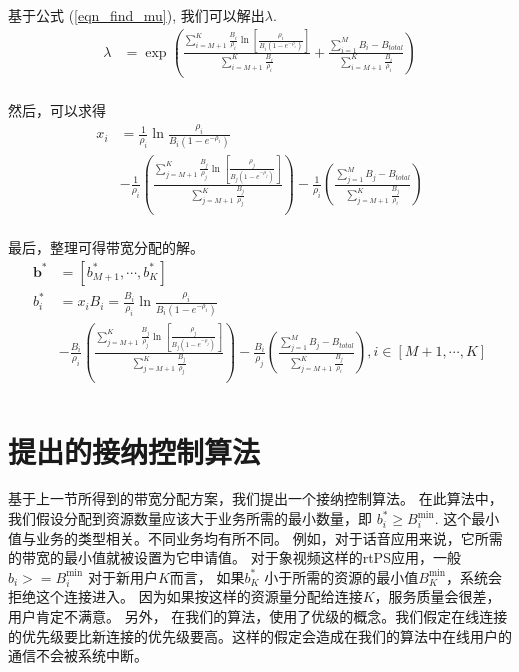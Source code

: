 基于公式 (\ref{eqn_find_mu}), 我们可以解出$\lambda$.
\begin{equation*}
\begin{split}
\lambda &= \exp \left( \frac{\sum_{i=M+1}^K \frac{B_i}{\rho_i} \ln \left[ \frac{\rho_i}{B_i(1-e^{-\rho_i})} \right]
}{\sum_{i=M+1}^K \frac{B_i}{\rho_i}} \right.
+ \left. \frac{ 
\sum_{i=1}^M B_i - B_{total}}{\sum_{i=M+1}^K \frac{B_i}{\rho_i}} \right)\\
\end{split}
\end{equation*}

然后，可以求得
%
\begin{equation}
\begin{split}
x_i & = \frac{1}{\rho_i} \ln \frac{\rho_i}{B_i(1-e^{-\rho_i})} \\
&-\frac{1}{\rho_i}\left( \frac{\sum_{j=M+1}^K \frac{B_j}{\rho_j} \ln \left[\frac{\rho_j}{B_j(1-e^{-\rho_j})}\right] 
}{\sum_{j=M+1}^K \frac{B_j}{\rho_j}} \right)
-\frac{1}{\rho_i}\left( \frac{ 
\sum_{j=1}^M B_j - B_{total}}{\sum_{j=M+1}^K \frac{B_j}{\rho_i}} \right) \\
\end{split}
\end{equation}
%

最后，整理可得带宽分配的解。
%
\begin{equation}
\begin{split}
\mathbf{b^*}& = [b^*_{M+1}, \cdots, b^*_{K}]\\
b_i^* & = x_iB_i = \frac{B_i}{\rho_i} \ln \frac{\rho_i}{B_i(1-e^{-\rho_i})} \\
&-\frac{B_i}{\rho_i}\left( \frac{\sum_{j=M+1}^K \frac{B_j}{\rho_j} \ln \left[\frac{\rho_j}{B_j(1-e^{-\rho_j})}\right] 
}{\sum_{j=M+1}^K \frac{B_j}{\rho_j}} \right)
 -\frac{B_i}{\rho_j}\left( \frac{ 
\sum_{j=1}^M B_j - B_{total}}{\sum_{j=M+1}^K \frac{B_j}{\rho_i}} \right), i \in [M+1, \cdots, K] \\
\end{split}
\label{eqn:b_i_bw}
\end{equation}
%
\section{提出的接纳控制算法}
\label{sec_alg}
基于上一节所得到的带宽分配方案，我们提出一个接纳控制算法。
在此算法中，我们假设分配到资源数量应该大于业务所需的最小数量，即
$b_i^* \ge B_i^{\min}$. 
这个最小值与业务的类型相关。不同业务均有所不同。
例如，对于话音应用来说，它所需的带宽的最小值就被设置为它申请值。
对于象视频这样的rtPS应用，一般$b_i>=B_i^{\min}$
对于新用户$K$而言，
如果$b_K^*$ 小于所需的资源的最小值$B_K^{\min}$，系统会拒绝这个连接进入。
因为如果按这样的资源量分配给连接$K$，服务质量会很差，用户肯定不满意。
另外，
在我们的算法，使用了优级的概念。我们假定在线连接的优先级要比新连接的优先级要高。这样的假定会造成在我们的算法中在线用户的通信不会被系统中断。

